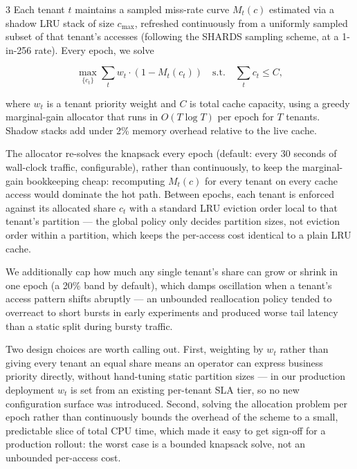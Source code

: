 \documentclass[a0,portrait,final]{sciposter}
\begin{document}
\begin{multicols}{3}
Each tenant $t$ maintains a sampled miss-rate curve $M_t(c)$ estimated via
a shadow LRU stack of size $c_{\max}$, refreshed continuously from a
uniformly sampled subset of that tenant's accesses (following the SHARDS
sampling scheme, at a 1-in-256 rate). Every epoch, we solve

\[
  \max_{\{c_t\}} \sum_t w_t \cdot (1 - M_t(c_t))
  \quad \text{s.t.} \quad \sum_t c_t \le C,
\]

\noindent where $w_t$ is a tenant priority weight and $C$ is total cache
capacity, using a greedy marginal-gain allocator that runs in
$O(T \log T)$ per epoch for $T$ tenants. Shadow stacks add under 2\% memory
overhead relative to the live cache.

The allocator re-solves the knapsack every epoch (default: every 30
seconds of wall-clock traffic, configurable), rather than continuously, to
keep the marginal-gain bookkeeping cheap: recomputing $M_t(c)$ for every
tenant on every cache access would dominate the hot path. Between epochs,
each tenant is enforced against its allocated share $c_t$ with a standard
LRU eviction order local to that tenant's partition — the global policy
only decides partition sizes, not eviction order within a partition, which
keeps the per-access cost identical to a plain LRU cache.

We additionally cap how much any single tenant's share can grow or shrink
in one epoch (a 20\% band by default), which damps oscillation when a
tenant's access pattern shifts abruptly — an unbounded reallocation policy
tended to overreact to short bursts in early experiments and produced
worse tail latency than a static split during bursty traffic.

Two design choices are worth calling out. First, weighting by $w_t$ rather
than giving every tenant an equal share means an operator can express
business priority directly, without hand-tuning static partition sizes —
in our production deployment $w_t$ is set from an existing per-tenant SLA
tier, so no new configuration surface was introduced. Second, solving the
allocation problem per epoch rather than continuously bounds the overhead
of the scheme to a small, predictable slice of total CPU time, which made
it easy to get sign-off for a production rollout: the worst case is a
bounded knapsack solve, not an unbounded per-access cost.


\end{multicols}
\end{document}
